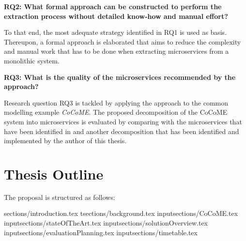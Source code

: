 \noindent
\textbf{RQ2: What formal approach can be constructed to perform the extraction process 
	without detailed know-how and manual effort?}

\vspace{0.5cm}
\noindent
To that end, the most adequate strategy identified in RQ1 is used as basis. Thereupon, a formal approach is elaborated that aims to reduce the complexity and manual work that has to be done when extracting microservices from a monolithic system.
\vspace{0.5cm}


\noindent
\textbf{RQ3: What is the quality of the microservices recommended by the approach?   }

\vspace{0.5cm}
\noindent
Research question RQ3 is tackled by applying the approach to the common modelling example \textit{CoCoME}. The proposed decomposition of the CoCoME system into microservices is evaluated by comparing with the microservices that have been identified in \cite{FunctionalDecompositionHeinrich} and another decomposition that has been identified and implemented by the author of this thesis.
\vspace{0.5cm}



\endgroup
\vspace{1cm}







\section{Thesis Outline}
\label{sec_Introduction:ThesisOutline}
The proposal is structured as follows:

{sections/introduction.tex}
t{sections/background.tex}
input{sections/CoCoME.tex}
input{sections/stateOfTheArt.tex}
input{sections/solutionOverview.tex}
input{sections/evaluationPlanning.tex}
input{sections/timetable.tex}

